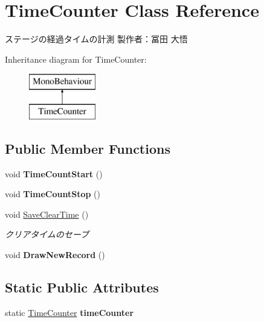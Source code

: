 \hypertarget{class_time_counter}{}\section{Time\+Counter Class Reference}
\label{class_time_counter}


ステージの経過タイムの計測 製作者：冨田 大悟  


Inheritance diagram for Time\+Counter\+:\begin{figure}[H]
\begin{center}
\leavevmode
\includegraphics[height=2.000000cm]{class_time_counter}
\end{center}
\end{figure}
\subsection*{Public Member Functions}
\begin{DoxyCompactItemize}
\item 
\mbox{\label{class_time_counter_a5fd45dbcd6dbf43cc7a6dd451d75535d}} 
void {\bfseries Time\+Count\+Start} ()
\item 
\mbox{\label{class_time_counter_a64355517bbd55bf72881a0a53cdbe44a}} 
void {\bfseries Time\+Count\+Stop} ()
\item 
void \hyperlink{class_time_counter_a9db34ad1843ea7df7e1d518300b42e1d}{Save\+Clear\+Time} ()
\begin{DoxyCompactList}\small\item\em クリアタイムのセーブ \end{DoxyCompactList}\item 
\mbox{\label{class_time_counter_abed5125da08d5ca0aaae3bb98d58086e}} 
void {\bfseries Draw\+New\+Record} ()
\end{DoxyCompactItemize}
\subsection*{Static Public Attributes}
\begin{DoxyCompactItemize}
\item 
\mbox{\label{class_time_counter_a02d8eba613ea62957a87d7b55b58a9a9}} 
static \hyperlink{class_time_counter}{Time\+Counter} {\bfseries time\+Counter}
\end{DoxyCompactItemize}
